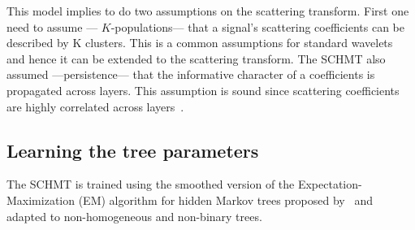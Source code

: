 \documentclass{article}
\begin{document}
    This model implies to do two assumptions on the scattering transform. First one need to assume --- $K$-populations--- that a signal’s scattering coefficients can be described by K clusters. This is a common assumptions for standard wavelets~\citep{kingsbury2001complex} and hence it can be extended to the scattering transform. The SCHMT also assumed ---persistence--- that the informative character of a coefficients is propagated across layers. This assumption is sound since scattering coefficients are highly correlated across layers~\citep{Oyallon}.
    
  \subsection{Learning the tree parameters}
    \label{subsec:SCHMT/Learning}    

    The SCHMT is trained using the smoothed version of the Expectation-Maximization (EM) algorithm \citep{someone} for hidden Markov trees proposed by~\citep{Durand} and adapted to non-homogeneous and non-binary trees.
    
\end{document}

